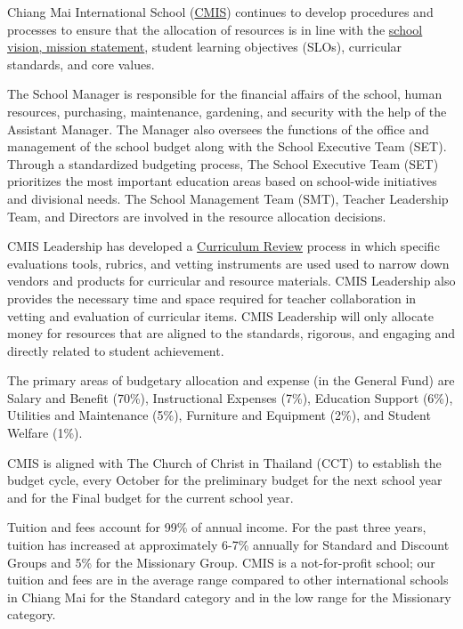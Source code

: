 \begin{findings}
Chiang Mai International School (\href{http://cmis.ac.th/}{CMIS}) continues to develop procedures and processes to ensure that the allocation of resources is in line with the \href{http://cmis.ac.th/about/vision}{school vision, mission statement}, student learning objectives (SLOs), curricular standards, and core values. 

The School Manager is responsible for the financial affairs of the school, human resources, purchasing, maintenance, gardening, and security with the help of the Assistant Manager. The Manager also oversees the functions of the office and management of the school budget along with the School Executive Team (SET). Through a standardized budgeting process, The School Executive Team (SET) prioritizes the most important education areas based on school-wide initiatives and divisional needs. The School Management Team (SMT), Teacher Leadership Team, and Directors are involved in the resource allocation decisions. 

CMIS Leadership has developed a \href{https://docs.google.com/document/d/1hh1nLUlJgg1hd7s6aG3u3We0L6o7Wg_ECdjc2f6DcT8/edit}{Curriculum Review} process in which specific evaluations tools, rubrics, and vetting instruments are used used to narrow down vendors and products for curricular and resource materials. CMIS Leadership also provides the necessary time and space required for teacher collaboration in vetting and evaluation of curricular items. CMIS Leadership will only allocate money for resources that are aligned to the standards, rigorous, and engaging and directly related to student achievement.  

The primary areas of budgetary allocation and expense (in the General Fund) are Salary and Benefit (70\%), Instructional Expenses (7\%), Education Support (6\%), Utilities and Maintenance (5\%), Furniture and Equipment (2\%), and Student Welfare (1\%). 

CMIS is aligned with The Church of Christ in Thailand (CCT) to establish the budget cycle, every October for the preliminary budget for the next school year and for the Final budget for the current school year.

Tuition and fees account for 99\% of annual income. For the past three years, tuition has increased at approximately 6-7\% annually for Standard and Discount Groups and 5\% for the Missionary Group. CMIS is a not-for-profit school; our tuition and fees are in the average range compared to other international schools in Chiang Mai for the Standard category and in the low range for the Missionary category.


\end{findings}
